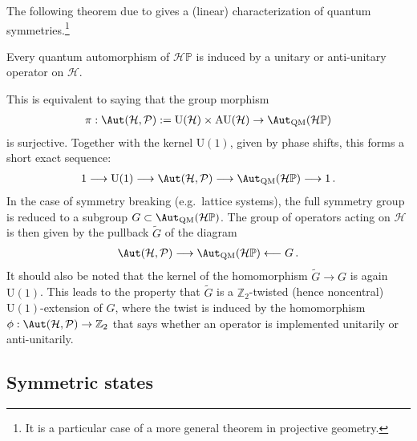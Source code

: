     The following theorem due to  gives a (linear) characterization of quantum symmetries.\footnote{It is a particular case of a more general theorem in projective geometry.}
    \begin{theorem}[Wigner]\label{qm:wigner}
        Every quantum automorphism of $\mathcal{H}\mathbb{P}$ is induced by a unitary or anti-unitary operator on $\mathcal{H}$.
    \end{theorem}
    This is equivalent to saying that the group morphism
    \begin{gather}
        \pi:\Aut(\mathcal{H},\mathcal{P}):=\mathrm{U}(\mathcal{H})\times\mathrm{AU}(\mathcal{H})\rightarrow\Aut_{\text{QM}}(\mathcal{H}\mathbb{P})
    \end{gather}
    is surjective. Together with the kernel $\mathrm{U}(1)$, given by phase shifts, this forms a short exact sequence:
    \begin{gather}
        1\longrightarrow\mathrm{U}(1)\longrightarrow\Aut(\mathcal{H},\mathcal{P})\longrightarrow\Aut_{\text{QM}}(\mathcal{H}\mathbb{P})\longrightarrow1\,.
    \end{gather}
    In the case of symmetry breaking (e.g.~lattice systems), the full symmetry group is reduced to a subgroup $G\subset\Aut_{\text{QM}}(\mathcal{H}\mathbb{P})$. The group of operators acting on $\mathcal{H}$ is then given by the pullback $\widetilde{G}$ of the diagram
    \begin{gather}
        \Aut(\mathcal{H},\mathcal{P})\longrightarrow\Aut_{\text{QM}}(\mathcal{H}\mathbb{P})\longleftarrow G\,.
    \end{gather}
    It should also be noted that the kernel of the homomorphism $\widetilde{G}\rightarrow G$ is again $\mathrm{U}(1)$. This leads to the property that $\widetilde{G}$ is a $\mathbb{Z}_2$-twisted (hence noncentral) $\mathrm{U}(1)$-extension of $G$, where the twist is induced by the homomorphism $\phi:\Aut(\mathcal{H},\mathcal{P})\rightarrow\mathbb{Z}_2$ that says whether an operator is implemented unitarily or anti-unitarily.

\subsection{Symmetric states}

